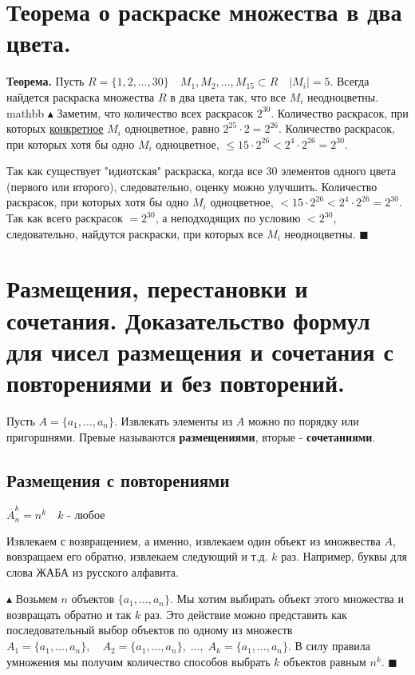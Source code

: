\setcounter{section}{27}

\section{Теорема о раскраске множества в два цвета.}

\textbf{Теорема.} Пусть $R=\{1,2,\ldots,30\} \quad M_1,M_2,\ldots,M_{15}\subset R \quad |M_i|=5$. Всегда найдется раскраска множества $R$ в два цвета так, что все $M_i$ неодноцветны.
mathbb $\blacktriangle$ Заметим, что количество всех раскрасок $2^{30}$. \newline Количество раскрасок, при которых \underline{конкретное} $M_i$ одноцветное, равно $2^{25}\cdot 2 = 2^{26}$. \newline Количество раскрасок, при которых хотя бы одно $M_i$ одноцветное, $\leq 15\cdot2^{26} < 2^4\cdot2^{26} = 2^{30}$.

Так как существует "идиотская" раскраска, когда все 30 элементов одного цвета (первого или второго), следовательно, оценку можно улучшить. Количество раскрасок, при которых хотя бы одно $M_i$ одноцветное, $< 15\cdot2^{26} < 2^4\cdot2^{26} = 2^{30}$. Так как всего раскрасок $=2^{30}$, а неподходящих по условию $<2^{30}$, следовательно, найдутся раскраски, при которых все $M_i$ неодноцветны. \quad $\blacksquare$

\section{Размещения, перестановки и сочетания. Доказательство формул для чисел размещения и сочетания с повторениями и без повторений. }

Пусть $A = \{a_1, \ldots, a_n\}$. Извлекать элементы из $A$ можно по порядку или пригоршнями. Превые называются \textbf{размещениями}, вторые - \textbf{сочетаниями}.

\subsection*{Размещения с повторениями}
$\overline {A}_n^k = n^k \quad k\text{ - любое}$ 
\\ \par Извлекаем с возвращением, а именно, извлекаем один объект из множвества $A$, вовзращаем его обратно, извлекаем следующий и т.д. $k$ раз. Например, буквы для слова ЖАБА из русского алфавита.
\par $\blacktriangle$ Возьмем $n$ объектов $\{a_1,\ldots,a_n\}$. Мы хотим выбирать объект этого множества и возвращать обратно и так $k$ раз. Это действие можно представить как последовательный выбор объектов по одному из множеств $A_1 = \{a_1,\ldots,a_n\}, \quad A_2 = \{a_1,\ldots,a_n\}, \; \ldots, \; A_k = \{a_1,\ldots,a_n\}$. В силу правила умножения мы получим количество способов выбрать $k$ объектов равным $n^k$. \quad $\blacksquare$

